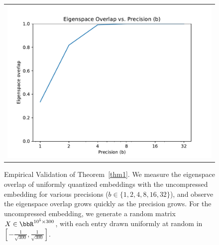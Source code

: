 
\begin{figure}
	\begin{tabular}{c}
		\includegraphics[width=\linewidth]{figures/micro_eig_overlap_vs_precision.pdf} 
\end{tabular}
\label{fig:micro_eigoverlap_vs_prec}
\caption{Empirical Validation of Theorem~\ref{thm1}. We measure the eigenspace overlap of uniformly quantized embeddings with the uncompressed embedding for various precisions ($b\in\{1,2,4,8,16,32\}$), and observe the eigenspace overlap grows quickly as the precision grows.  For the uncompressed embedding, we generate a random matrix $X \in \RR^{10^5 \times 300}$, with each entry drawn uniformly at random in $[-\frac{1}{\sqrt{300}}, \frac{1}{\sqrt{300}}]$.}
\end{figure}

